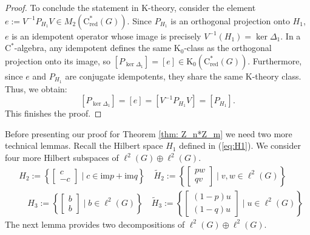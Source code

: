 \documentclass[a4paper,leqno,12pt]{article}
\numberwithin{equation}{section}
\theoremstyle{plain}
\theoremstyle{definition}
\theoremstyle{remark}
\newcommand{\Cs}{\mathrm{C}^*}
\newcommand{\Csr}{\mathrm{C}^*_{\text{red}}}
\begin{document}
\begin{proof}
To conclude the statement in K-theory, consider the element $e := V^{-1} P_{H_1} V \in M_2(\Csr(G))$. Since $P_{H_1}$ is an orthogonal projection onto $H_1$, $e$ is an idempotent operator whose image is precisely $V^{-1}(H_1) = \ker \Delta_1$. In a $\Cs$-algebra, any idempotent defines the same $\mathrm K_0$-class as the orthogonal projection onto its image, so $[P_{\ker \Delta_1}] = [e] \in \mathrm K_0(\Csr(G))$. Furthermore, since $e$ and $P_{H_1}$ are conjugate idempotents, they share the same K-theory class. Thus, we obtain:
\[
[P_{\ker \Delta_1}] = [e] = [V^{-1} P_{H_1} V] = [P_{H_1}].
\]
This finishes the proof.
	\end{proof}
	
	Before presenting our proof for Theorem \ref{thm: Z_n*Z_m} we need two more technical lemmas. 
	Recall the Hilbert space $H_1$ defined in (\ref{eq:H1}). We consider four more Hilbert subspaces of $\ell^2(G)\oplus \ell^2(G)$.
	\begin{align} \label{eq7}
		& H_2:=\left\{\begin{bmatrix}c\\ -c\end{bmatrix} \mid  c\in \mathrm{im}p+\mathrm{im}q \right\}  \quad
		\tilde H_2:=\left\{\begin{bmatrix}pw\\ qv\end{bmatrix} \mid  v,w\in \ell^2(G) \right\}
		\\
		& \quad H_3:=\left\{\begin{bmatrix}b \\ b \end{bmatrix} \mid  b\in \ell^2(G) \right\}   
		\quad \tilde H_3:=\left\{\begin{bmatrix}(1-p)u \\ (1-q)u \end{bmatrix} \mid  u \in \ell^2(G) \right\}
	\end{align}
	The next lemma provides two decompositions of $\ell^2(G)\oplus \ell^2(G)$.
	
\end{document}

